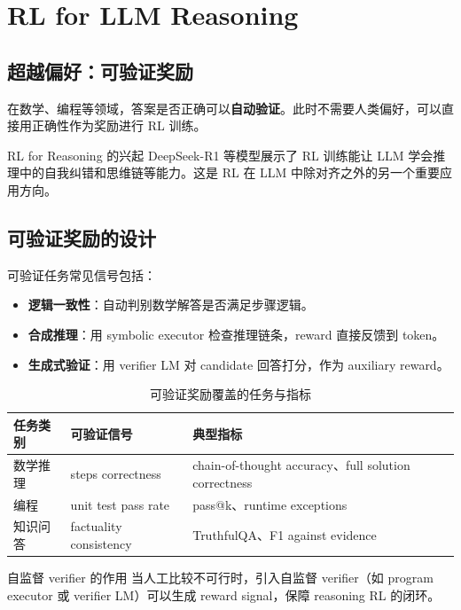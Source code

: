 \section{RL for LLM Reasoning}

\subsection{超越偏好：可验证奖励}

在数学、编程等领域，答案是否正确可以\textbf{自动验证}。此时不需要人类偏好，可以直接用正确性作为奖励进行 RL 训练。

\begin{importantbox}{RL for Reasoning 的兴起}
DeepSeek-R1 等模型展示了 RL 训练能让 LLM 学会推理中的自我纠错和思维链等能力。这是 RL 在 LLM 中除对齐之外的另一个重要应用方向。
\end{importantbox}

\subsection{可验证奖励的设计}

可验证任务常见信号包括：
\begin{itemize}
    \item \textbf{逻辑一致性}：自动判别数学解答是否满足步骤逻辑。
    \item \textbf{合成推理}：用 symbolic executor 检查推理链条，reward 直接反馈到 token。
    \item \textbf{生成式验证}：用 verifier LM 对 candidate 回答打分，作为 auxiliary reward。
\end{itemize}

\begin{table}[H]
\centering
\begin{tabular}{p{} p{} p{}}
\toprule
任务类别 & 可验证信号 & 典型指标 \\
\midrule
数学推理 & steps correctness & chain-of-thought accuracy、full solution correctness \\
编程 & unit test pass rate & pass@k、runtime exceptions \\
知识问答 & factuality consistency & TruthfulQA、F1 against evidence \\
\bottomrule
\end{tabular}
\caption{可验证奖励覆盖的任务与指标}
\end{table}

\begin{knowledgebox}{自监督 verifier 的作用}
当人工比较不可行时，引入自监督 verifier（如 program executor 或 verifier LM）可以生成 reward signal，保障 reasoning RL 的闭环。
\end{knowledgebox}


